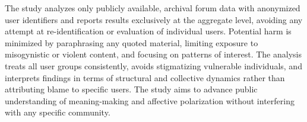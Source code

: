 

The study analyzes only publicly available, archival forum data with anonymized user identifiers and reports results exclusively at the aggregate level, avoiding any attempt at re-identification or evaluation of individual users.
Potential harm is minimized by paraphrasing any quoted material, limiting exposure to misogynistic or violent content, and focusing on patterns of interest.
The analysis treats all user groups consistently, avoids stigmatizing vulnerable individuals, and interprets findings in terms of structural and collective dynamics rather than attributing blame to specific users.
The study aims to advance public understanding of meaning-making and affective polarization without interfering with any specific community.


